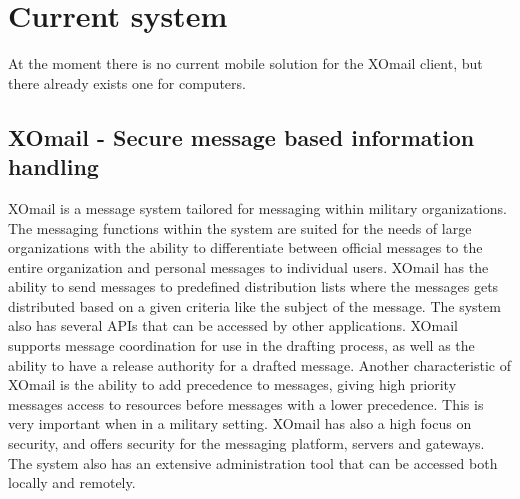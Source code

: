 \section{Current system}

At the moment there is no current mobile solution for the XOmail client, but there already exists one for computers.

\subsection{XOmail - Secure message based information handling}

XOmail is a message system tailored for messaging within military organizations. The messaging functions within the system are suited for the needs of large
organizations with the ability to differentiate between official messages to
the entire organization and personal messages to individual users.
\newline
\newline
XOmail has the ability to send messages to predefined distribution lists where the
messages gets distributed based on a given criteria like the subject of the
message. The system also has several APIs that can be accessed by other
applications. XOmail supports message coordination for use in the drafting
process, as well as the ability to have a release authority for a drafted message.
\newline
\newline 
Another characteristic of XOmail is the ability to add precedence to messages, giving high priority messages access to resources before messages with a lower precedence. This is very important when in a military setting.
\newline
\newline
XOmail has also a high focus on security, and offers security for the messaging platform, servers
and gateways.
\newline
\newline
The system also has an extensive administration tool that can be accessed both locally and remotely.